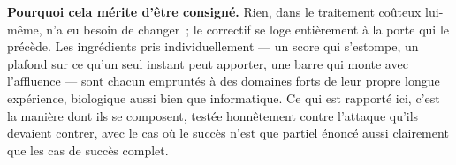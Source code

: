 \documentclass[11pt]{article}
\begin{document}
\textbf{Pourquoi cela mérite d'être consigné.} Rien, dans le traitement
coûteux lui-même, n'a eu besoin de changer~; le correctif se loge
entièrement à la porte qui le précède. Les ingrédients pris
individuellement --- un score qui s'estompe, un plafond sur ce qu'un
seul instant peut apporter, une barre qui monte avec l'affluence --- sont
chacun empruntés à des domaines forts de leur propre longue expérience,
biologique aussi bien que informatique. Ce qui est rapporté ici, c'est la
manière dont ils se composent, testée honnêtement contre l'attaque
qu'ils devaient contrer, avec le cas où le succès n'est que partiel
énoncé aussi clairement que les cas de succès complet.
\end{document}
